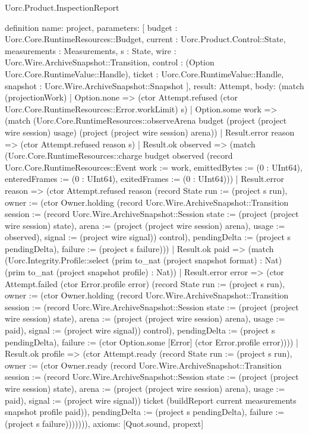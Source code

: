 \begin{lexlean}{Uorc.Product.InspectionReport}
\begin{semanticmodule}
definition{
  name: project,
  parameters: [
    budget : Uorc.Core.RuntimeResources::Budget,
    current : Uorc.Product.Control::State,
    measurements : Measurements,
    s : State,
    wire : Uorc.Wire.ArchiveSnapshot::Transition,
    control : (Option Uorc.Core.RuntimeValue::Handle),
    ticket : Uorc.Core.RuntimeValue::Handle,
    snapshot : Uorc.Wire.ArchiveSnapshot::Snapshot
  ],
  result: Attempt,
  body: (match (projectionWork)
    | Option.none => (ctor Attempt.refused (ctor Uorc.Core.RuntimeResources::Error.workLimit) s)
    | Option.some work => (match (Uorc.Core.RuntimeResources::observeArena budget (project (project wire session) usage) (project (project wire session) arena))
      | Result.error reason => (ctor Attempt.refused reason s)
      | Result.ok observed => (match (Uorc.Core.RuntimeResources::charge budget observed (record Uorc.Core.RuntimeResources::Event {work := work, emittedBytes := (0 : UInt64), enteredFrames := (0 : UInt64), exitedFrames := (0 : UInt64)}))
        | Result.error reason => (ctor Attempt.refused reason (record State {run := (project s run), owner := (ctor Owner.holding (record Uorc.Wire.ArchiveSnapshot::Transition {session := (record Uorc.Wire.ArchiveSnapshot::Session {state := (project (project wire session) state), arena := (project (project wire session) arena), usage := observed}), signal := (project wire signal)}) control), pendingDelta := (project s pendingDelta), failure := (project s failure)}))
        | Result.ok paid => (match (Uorc.Integrity.Profile::select (prim to_nat (project snapshot format) : Nat) (prim to_nat (project snapshot profile) : Nat))
          | Result.error error => (ctor Attempt.failed (ctor Error.profile error) (record State {run := (project s run), owner := (ctor Owner.holding (record Uorc.Wire.ArchiveSnapshot::Transition {session := (record Uorc.Wire.ArchiveSnapshot::Session {state := (project (project wire session) state), arena := (project (project wire session) arena), usage := paid}), signal := (project wire signal)}) control), pendingDelta := (project s pendingDelta), failure := (ctor Option.some [Error] (ctor Error.profile error))}))
          | Result.ok profile => (ctor Attempt.ready (record State {run := (project s run), owner := (ctor Owner.ready (record Uorc.Wire.ArchiveSnapshot::Transition {session := (record Uorc.Wire.ArchiveSnapshot::Session {state := (project (project wire session) state), arena := (project (project wire session) arena), usage := paid}), signal := (project wire signal)}) ticket (buildReport current measurements snapshot profile paid)), pendingDelta := (project s pendingDelta), failure := (project s failure)})))))),
  axioms: [Quot.sound, propext]
}


\end{semanticmodule}
\end{lexlean}
